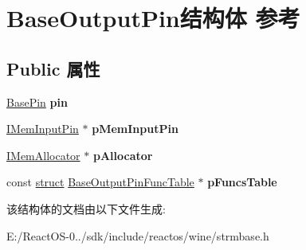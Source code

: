 \hypertarget{struct_base_output_pin}{}\section{Base\+Output\+Pin结构体 参考}
\label{struct_base_output_pin}
\subsection*{Public 属性}
\begin{DoxyCompactItemize}
\item 
\mbox{\label{struct_base_output_pin_ac9f526722c35e00a38e28dab8f908fb6}} 
\hyperlink{struct_base_pin}{Base\+Pin} {\bfseries pin}
\item 
\mbox{\label{struct_base_output_pin_a0dbc3538fb528f4b1e2a702abfaab19a}} 
\hyperlink{interface_i_mem_input_pin}{I\+Mem\+Input\+Pin} $\ast$ {\bfseries p\+Mem\+Input\+Pin}
\item 
\mbox{\label{struct_base_output_pin_a1782bcc5bcf9c0b5b90e42cb9affd560}} 
\hyperlink{interface_i_mem_allocator}{I\+Mem\+Allocator} $\ast$ {\bfseries p\+Allocator}
\item 
\mbox{\label{struct_base_output_pin_a5a9dfba7908314f0a458d384a5a4303c}} 
const \hyperlink{interfacestruct}{struct} \hyperlink{struct_base_output_pin_func_table}{Base\+Output\+Pin\+Func\+Table} $\ast$ {\bfseries p\+Funcs\+Table}
\end{DoxyCompactItemize}


该结构体的文档由以下文件生成\+:\begin{DoxyCompactItemize}
\item 
E\+:/\+React\+O\+S-\/0../sdk/include/reactos/wine/strmbase.\+h\end{DoxyCompactItemize}
